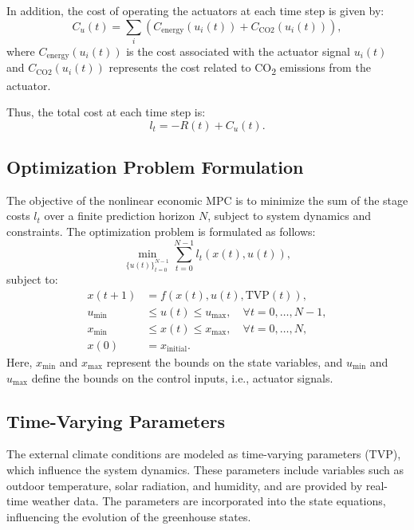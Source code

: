\documentclass[conference]{IEEEtran}
\begin{document}
In addition, the cost of operating the actuators at each time step is given by:
\begin{equation}
    C_u(t) = \sum_{i} \left( C_{\text{energy}}(u_i(t)) + C_{\text{CO2}}(u_i(t)) \right),
\end{equation}
where \(C_{\text{energy}}(u_i(t))\) is the cost associated with the actuator signal \(u_i(t)\) and \(C_{\text{CO2}}(u_i(t))\) represents the cost related to CO\textsubscript{2} emissions from the actuator.

Thus, the total cost at each time step is:
\begin{equation}
    l_t = -R(t) + C_u(t).
\end{equation}

\subsection{Optimization Problem Formulation}

The objective of the nonlinear economic MPC is to minimize the sum of the stage costs \(l_t\) over a finite prediction horizon \(N\), subject to system dynamics and constraints. The optimization problem is formulated as follows:
\begin{equation}
    \min_{{\{u(t)\}}_{t=0}^{N-1}} \sum_{t=0}^{N-1} l_t(x(t), u(t)),
\end{equation}
subject to:
\begin{align}
    x(t+1)   & = f(x(t), u(t), \text{TVP}(t)),                           \\
    u_{\min} & \leq u(t) \leq u_{\max}, \quad \forall t = 0, \dots, N-1, \\
    x_{\min} & \leq x(t) \leq x_{\max}, \quad \forall t = 0, \dots, N,   \\
    x(0)     & = x_{\text{initial}}.
\end{align}
Here, \(x_{\min}\) and \(x_{\max}\) represent the bounds on the state variables, and \(u_{\min}\) and \(u_{\max}\) define the bounds on the control inputs, i.e., actuator signals.

\subsection{Time-Varying Parameters}

The external climate conditions are modeled as time-varying parameters (TVP), which influence the system dynamics. These parameters include variables such as outdoor temperature, solar radiation, and humidity, and are provided by real-time weather data. The parameters are incorporated into the state equations, influencing the evolution of the greenhouse states.
\end{document}
